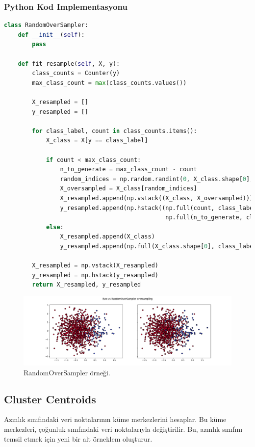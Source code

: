 \subsubsection{Python Kod Implementasyonu}

\begin{lstlisting}[language=Python]
class RandomOverSampler:
    def __init__(self):
        pass

    def fit_resample(self, X, y):
        class_counts = Counter(y)
        max_class_count = max(class_counts.values())

        X_resampled = []
        y_resampled = []

        for class_label, count in class_counts.items():
            X_class = X[y == class_label]

            if count < max_class_count:
                n_to_generate = max_class_count - count
                random_indices = np.random.randint(0, X_class.shape[0], size=n_to_generate)
                X_oversampled = X_class[random_indices]
                X_resampled.append(np.vstack((X_class, X_oversampled)))
                y_resampled.append(np.hstack((np.full(count, class_label), 
                                              np.full(n_to_generate, class_label))))
            else:
                X_resampled.append(X_class)
                y_resampled.append(np.full(X_class.shape[0], class_label))

        X_resampled = np.vstack(X_resampled)
        y_resampled = np.hstack(y_resampled)
        return X_resampled, y_resampled
\end{lstlisting}

\begin{figure}[h]
    \centering
    \includegraphics[width=1\textwidth]{images/Raw vs RandomOverSampler oversampling.png}
    \caption{RandomOverSampler örneği.}
    \label{fig:enter-label}
\end{figure}

\newpage

\subsection{Cluster Centroids}
Azınlık sınıfındaki veri noktalarının küme merkezlerini hesaplar. Bu küme merkezleri, çoğunluk sınıfındaki veri noktalarıyla değiştirilir. Bu, azınlık sınıfını temsil etmek için yeni bir alt örneklem oluşturur.

